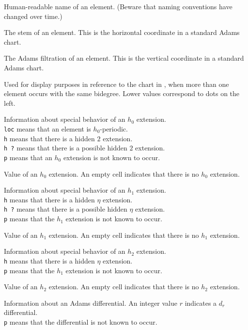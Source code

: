 \documentclass{amsart}
\begin{document}
  Human-readable name of an element.
(Beware that naming conventions have changed over time.)

 The stem of an element.  This is the
horizontal coordinate in a standard Adams chart.

 The Adams filtration of 
an element.  This is the vertical coordinate in a standard 
Adams chart.

 Used for display purposes
in reference to the chart in \cite{IWX19c},
when more than one element occurs with the same bidegree.
Lower values correspond to dots on the left.

Information about special behavior of an $h_0$ extension. \\
\texttt{loc} means that an element is $h_0$-periodic. \\
\texttt{h} means that there is a hidden $2$ extension. \\
\texttt{h ?} means that there is a possible hidden $2$ extension. \\
\texttt{p} means that an $h_0$ extension is not known to occur.

 Value of an $h_0$ extension.  An empty cell indicates
that there is no $h_0$ extension.

Information about special behavior of an $h_1$ extension. \\
\texttt{h} means that there is a hidden $\eta$ extension. \\
\texttt{h ?} means that there is a possible hidden $\eta$ extension. \\
\texttt{p} means that the $h_1$ extension is not known to occur.

Value of an $h_1$ extension.  An empty cell indicates
that there is no $h_1$ extension.

Information about special behavior of an $h_2$ extension. \\
\texttt{h} means that there is a hidden $\eta$ extension. \\
\texttt{p} means that the $h_1$ extension is not known to occur.

Value of an $h_2$ extension.  An empty cell indicates
that there is no $h_2$ extension.

Information about an Adams differential.
An integer value $r$ indicates a $d_r$ differential. \\
\texttt{p} means that the differential is not known to occur.
\end{document}
